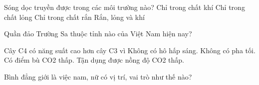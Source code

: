 \begin{ex}
    Sóng dọc truyền được trong các môi trường nào?
    \choice
    {Chỉ trong chất khí}
    {Chỉ trong chất lỏng}
    {Chỉ trong chất rắn}
    {\True Rắn, lỏng và khí}

\end{ex}
\begin{ex}
    Quần đảo Trường Sa thuộc tỉnh nào của Việt Nam hiện nay?
\end{ex}
\begin{ex}
    Cây C4 có năng suất cao hơn cây C3 vì
    \choiceTF
    {\True Không có hô hấp sáng.}
    {Không có pha tối.}
    {\True Có điểm bù CO2 thấp.}
    {\True Tận dụng được nồng độ CO2 thấp.}

\end{ex}
\begin{ex}
    Bình đẳng giới là việc nam, nữ có vị trí, vai trò như thế nào?
\end{ex}
